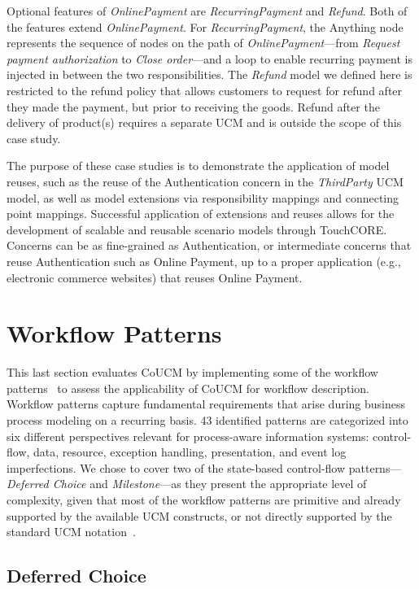 Optional features of \emph{OnlinePayment} are \emph{RecurringPayment} and \emph{Refund}. Both of the features extend \emph{OnlinePayment}. For \emph{RecurringPayment}, the {\cls Anything} node represents the sequence of nodes on the path of \emph{OnlinePayment}---from \emph{Request payment authorization} to \emph{Close order}---and a loop to enable recurring payment is injected in between the two responsibilities. The \emph{Refund} model we defined here is restricted to the refund policy that allows customers to request for refund after they made the payment, but prior to receiving the goods. Refund after the delivery of product(s) requires a separate UCM and is outside the scope of this case study.

The purpose of these case studies is to demonstrate the application of model reuses, such as the reuse of the Authentication concern in the \emph{ThirdParty} UCM model, as well as model extensions via responsibility mappings and connecting point mappings. Successful application of extensions and reuses allows for the development of scalable and reusable scenario models through TouchCORE. Concerns can be as fine-grained as Authentication, or intermediate concerns that reuse Authentication such as Online Payment, up to a proper application (e.g., electronic commerce websites) that reuses Online Payment.

\section{Workflow Patterns} \label{sec:4.3}

This last section evaluates CoUCM by implementing some of the workflow patterns~\cite{van2003workflow, russell2006workflow} to assess the applicability of CoUCM for workflow description. Workflow patterns capture fundamental requirements that arise during business process modeling on a recurring basis. 43 identified patterns are categorized into six different perspectives relevant for process-aware information systems: control-flow, data, resource, exception handling, presentation, and event log imperfections. We chose to cover two of the state-based control-flow patterns---\emph{Deferred Choice} and \emph{Milestone}---as they present the appropriate level of complexity, given that most of the workflow patterns are primitive and already supported by the available UCM constructs, or not directly supported by the standard UCM notation~\cite{mussbacher2011aspect}.

\subsection{Deferred Choice}

